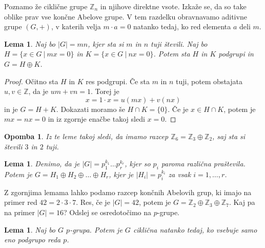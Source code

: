 \documentclass[10pt, a4paper]{article}
\newtheorem*{opomba}{Opomba}
\newtheorem{lema}[izr]{Lema}
\newenvironment{noticeC}{%
  \tcolorbox[%
  notitle,
  empty,
  enhanced,  %
  breakable,
  coltext=black, 
  fontupper=\rmfamily,
  parbox=false,
  noparskip,
  sharp corners,
  boxrule=-1pt,  %
  frame hidden,
  left=7pt,  %
  right=7pt,
  top=5pt,
  bottom=5pt,
  before skip=2.5ex plus 2pt,
  after skip=2.5ex plus 2pt,
  overlay unbroken and last={%
  },
  ]}
{\endtcolorbox}
\newenvironment{dokaz}%
  {\begin{noticeC}\begin{proof}}%
  {\end{proof}\end{noticeC}}
\newcommand{\Z}{\mathbb {Z}}
\begin{document}
Poznamo že ciklične grupe $\Z_n$ in njihove direktne vsote.
Izkaže se, da so take oblike prav vse končne Abelove grupe.
V tem razdelku obravnavamo aditivne grupe $(G, +)$, 
v katerih velja $m \cdot a = 0$ natanko tedaj, ko red elementa $a$ deli $m$.

\begin{lema}
  Naj bo $|G| = mn$, kjer sta si $m$ in $n$ tuji števili.
  Naj bo $H = \{x \in G\ |\ mx = 0\}$ in $K = \{x \in G\ |\ nx = 0\}$.
  Potem sta $H$ in $K$ podgrupi in $G = H \oplus K$. 
\end{lema}

\begin{dokaz}
  Očitno sta $H$ in $K$ res podgrupi.
  Če sta $m$ in $n$ tuji, potem obstajata $u, v \in \Z$,
  da je $um + vn = 1$. Torej je 
  $$x = 1 \cdot x = u(mx) + v(nx)$$ in je $G = H + K$.
  Dokazati moramo še $H \cap K = \{0\}$.
  Če je $x \in H \cap K$, potem je $mx = nx = 0$ in iz zgornje enačbe takoj sledi $x = 0$.
\end{dokaz}

\begin{opomba}
  Iz te leme takoj sledi, da imamo razcep $\Z_6 = \Z_3 \oplus \Z_2$,
  saj sta si števili $3$ in $2$ tuji.
\end{opomba}

\begin{lema}
  Denimo, da je $|G| = p_1^{k_1} \dots p_r^{k_r}$, kjer so $p_i$ paroma različna praštevila.
  Potem je $G = H_1 \oplus H_2 \oplus \dots \oplus H_r$, kjer je $|H_i| = p_i^{k_i}$
  za vsak $i = 1, \dots, r$.
\end{lema}

Z zgornjima lemama lahko podamo razcep končnih Abelovih grup, ki imajo na primer 
red $42 = 2 \cdot 3 \cdot 7$. Res, če je $|G| = 42$, potem je $G = \Z_2 \oplus \Z_3 \oplus \Z_7$.
Kaj pa na primer $|G| = 16$? Odslej se osredotočimo na $p$-grupe.

\begin{lema}
  Naj bo $G$ $p$-grupa. Potem je $G$ ciklična natanko tedaj, ko vsebuje samo eno 
  podgrupo reda $p$.
\end{lema}
\end{document}
